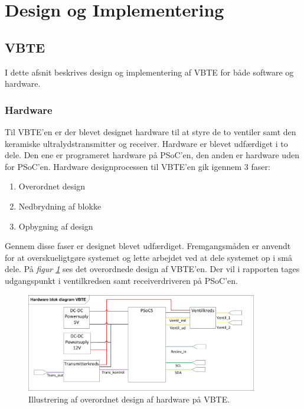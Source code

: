 \section{Design og Implementering}
\label{ch:DesignImplementering}
\subsection{VBTE}
I dette afsnit beskrives design og implementering af VBTE for både software og hardware. 
\subsubsection{Hardware}
Til VBTE'en er der blevet designet hardware til at styre de to ventiler samt den keramiske ultralydstransmitter og receiver. Hardware er blevet udfærdiget i to dele. Den ene er programeret hardware på PSoC'en, den anden er hardware uden for PSoC'en. Hardware designprocessen til VBTE'en gik igennem 3 faser:
\begin{enumerate}
\item Overordnet design
\item Nedbrydning af blokke
\item Opbygning af design
\end{enumerate}
Gennem disse faser er designet blevet udfærdiget. Fremgangsmåden er anvendt for at overskueligtgøre systemet og lette arbejdet ved at dele systemet op i små dele. På \textit{figur \ref{fig:HWVBTE}} ses det overordnede design af VBTE'en. Der vil i rapporten tages udgangspunkt i ventilkredsen samt receiverdriveren på PSoC'en.
\begin{figure}[H]
\centering
\includegraphics[width = 0.9\textwidth]{billeder/HWVBTE}
\caption{Illustrering af overordnet design af hardware på VBTE.}
\label{fig:HWVBTE}
\end{figure}
